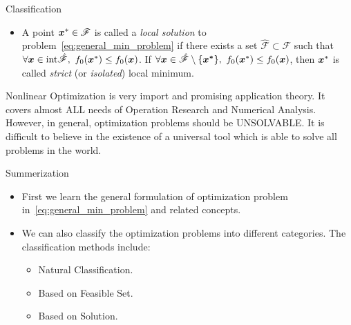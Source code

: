\begin{note}{Classification}
\begin{enumerate}
\begin{itemize}
                \item A point \(\boldsymbol{x}^* \in \mathscr{F}\) is called a \emph{local solution} to problem~\ref{eq:general_min_problem} if there exists a set \(\hat{\mathscr{F}} \subset \mathscr{F}\) such that \(\forall \boldsymbol{x} \in \mathrm{int}\hat{\mathscr{F}}, ~f_0(\boldsymbol{x}^*) \le f_0(\boldsymbol{x})\). If \(\forall \boldsymbol{x} \in \hat{\mathscr{F}} \setminus \{\boldsymbol{{x}^*}\}, ~f_0(\boldsymbol{x}^*) \le f_0(\boldsymbol{x})\), then \(\boldsymbol{x}^*\) is called \emph{strict} (or \emph{isolated}) local minimum.
            \end{itemize}
    \end{enumerate}
\end{note}

Nonlinear Optimization is very import and promising application theory. It covers almost ALL needs of Operation Research and Numerical Analysis. However, in general, optimization problems should be UNSOLVABLE. It is difficult to believe in the existence of a universal tool which is able to solve all problems in the world.

\begin{boxnote}{Summerization}
    \begin{itemize}
        \item First we learn the general formulation of optimization problem in~\ref{eq:general_min_problem} and related concepts.
        \item We can also classify the optimization problems into different categories. The classification methods include:
              \begin{itemize}
                \item Natural Classification.
                \item Based on Feasible Set.
                \item Based on Solution.
              \end{itemize} 
    \end{itemize}
\end{boxnote}

